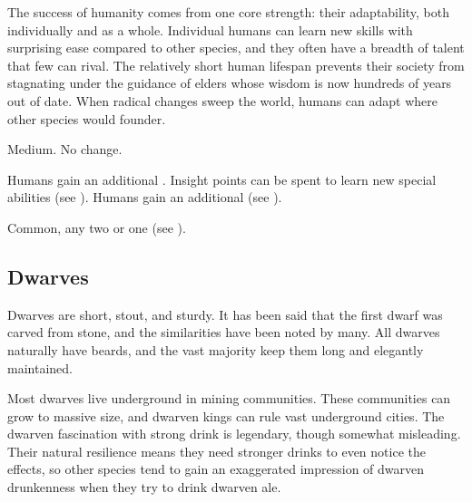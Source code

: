         The success of humanity comes from one core strength: their adaptability, both individually and as a whole.
        Individual humans can learn new skills with surprising ease compared to other species, and they often have a breadth of talent that few can rival.
        The relatively short human lifespan prevents their society from stagnating under the guidance of elders whose wisdom is now hundreds of years out of date.
        When radical changes sweep the world, humans can adapt where other species would founder.

         Medium.
         No change.
        \begin{raggeditemize}
             Humans gain an additional .
                Insight points can be spent to learn new special abilities (see ).
             Humans gain an additional  (see ).
        \end{raggeditemize}
         Common, any two  or one  (see ).

    \subsection{Dwarves}

        Dwarves are short, stout, and sturdy.
        It has been said that the first dwarf was carved from stone, and the similarities have been noted by many.
        All dwarves naturally have beards, and the vast majority keep them long and elegantly maintained.

        Most dwarves live underground in mining communities.
        These communities can grow to massive size, and dwarven kings can rule vast underground cities.
        The dwarven fascination with strong drink is legendary, though somewhat misleading.
        Their natural resilience means they need stronger drinks to even notice the effects, so other species tend to gain an exaggerated impression of dwarven drunkenness when they try to drink dwarven ale.

